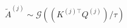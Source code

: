 ﻿\documentclass{article}
\begin{document}
\begin{preview}
\(\displaystyle
\tilde{A}^{(j)} \sim \mathcal{G}\left((K^{(j)\top}Q^{(j)})/\tau\right)
\)
\end{preview}
\end{document}
